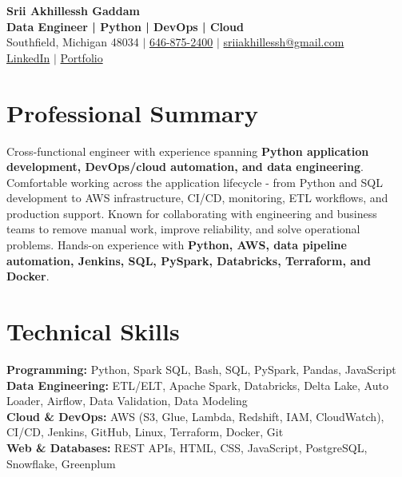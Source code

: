 \documentclass[letterpaper,10pt]{article}
\begin{document}
\fontsize{9.35pt}{10.45pt}\selectfont

\begin{center}
    {\LARGE \textbf{Srii Akhillessh Gaddam}} \\[-1pt]
    \textbf{Data Engineer | Python | DevOps | Cloud} \\[2pt]
    Southfield, Michigan 48034 $|$
    \href{tel:6468752400}{646-875-2400} $|$
    \href{mailto:sriiakhillessh@gmail.com}{sriiakhillessh@gmail.com} \\[1pt]
    \href{https://www.linkedin.com/in/srii-akhiilessh-gaddam-b48668191/}{LinkedIn} $|$
    \href{https://sriiakhillesshg.github.io/portfolio/}{Portfolio}
\end{center}
\vspace{-8pt}

\section{Professional Summary}
\small{Cross-functional engineer with experience spanning \textbf{Python application development, DevOps/cloud automation, and data engineering}. Comfortable working across the application lifecycle - from Python and SQL development to AWS infrastructure, CI/CD, monitoring, ETL workflows, and production support. Known for collaborating with engineering and business teams to remove manual work, improve reliability, and solve operational problems. Hands-on experience with \textbf{Python, AWS, data pipeline automation, Jenkins, SQL, PySpark, Databricks, Terraform, and Docker}.}

\section{Technical Skills}
\small{
\textbf{Programming:} Python, Spark SQL, Bash, SQL, PySpark, Pandas, JavaScript \\
\textbf{Data Engineering:} ETL/ELT, Apache Spark, Databricks, Delta Lake, Auto Loader, Airflow, Data Validation, Data Modeling \\
\textbf{Cloud \& DevOps:} AWS (S3, Glue, Lambda, Redshift, IAM, CloudWatch), CI/CD, Jenkins, GitHub, Linux, Terraform, Docker, Git \\
\textbf{Web \& Databases:} REST APIs, HTML, CSS, JavaScript, PostgreSQL, Snowflake, Greenplum
}

\end{document}
